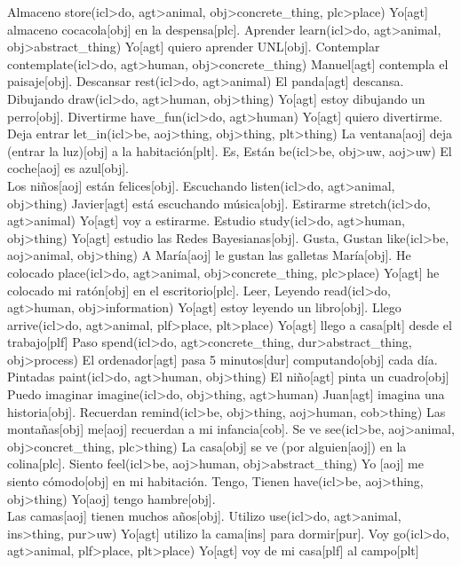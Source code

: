 \documentclass{article}
\begin{document}
{
    \uw
    {Almaceno}
    {store(icl>do, agt>animal, obj>concrete\_thing, plc>place)}
    {Yo[agt] almaceno cocacola[obj] en la despensa[plc].}
    \uw
    {Aprender}
    {learn(icl>do, agt>animal, obj>abstract\_thing)}
    {Yo[agt] quiero aprender UNL[obj].}
    \uw
    {Contemplar}
    {contemplate(icl>do, agt>human, obj>concrete\_thing)}
    {Manuel[agt] contempla el paisaje[obj].}
    \uw
    {Descansar}
    {rest(icl>do, agt>animal)}
    {El panda[agt] descansa.}
    \uw
    {Dibujando}
    {draw(icl>do, agt>human, obj>thing)}
    {Yo[agt] estoy dibujando un perro[obj].}
    \uw
    {Divertirme}
    {have\_fun(icl>do, agt>human)}
    {Yo[agt] quiero divertirme.}
    \uw
    {Deja entrar}
    {let\_in(icl>be, aoj>thing, obj>thing, plt>thing)}
    {La ventana[aoj] deja (entrar la luz)[obj] a la habitación[plt].}
    \uw
    {Es, Están}
    {be(icl>be, obj>uw, aoj>uw)}
    {El coche[aoj] es azul[obj].\\
    Los niños[aoj] están felices[obj].}
    \uw
    {Escuchando}
    {listen(icl>do, agt>animal, obj>thing)}
    {Javier[agt] está escuchando música[obj].}
    \uw
    {Estirarme}
    {stretch(icl>do, agt>animal)}
    {Yo[agt] voy a estirarme.}
    \uw
    {Estudio}
    {study(icl>do, agt>human, obj>thing)}
    {Yo[agt] estudio las Redes Bayesianas[obj].}
    \uw
    {Gusta, Gustan}
    {like(icl>be, aoj>animal, obj>thing)}
    {A María[aoj] le gustan las galletas María[obj].}
    \uw
    {He colocado}
    {place(icl>do, agt>animal, obj>concrete\_thing, plc>place)}
    {Yo[agt] he colocado mi ratón[obj] en el escritorio[plc].}
    \uw
    {Leer, Leyendo}
    {read(icl>do, agt>human, obj>information)}
    {Yo[agt] estoy leyendo un libro[obj].}
    \uw
    {Llego}
    {arrive(icl>do, agt>animal, plf>place, plt>place)}
    {Yo[agt] llego a casa[plt] desde el trabajo[plf]}
    \uw
    {Paso}
    {spend(icl>do, agt>concrete\_thing, dur>abstract\_thing, obj>process)}
    {El ordenador[agt] pasa 5 minutos[dur] computando[obj] cada día.}
    \uw
    {Pintadas}
    {paint(icl>do, agt>human, obj>thing)}
    {El niño[agt] pinta un cuadro[obj]}
    \uw
    {Puedo imaginar}
    {imagine(icl>do, obj>thing, agt>human)}
    {Juan[agt] imagina una historia[obj].}
    \uw
    {Recuerdan}
    {remind(icl>be, obj>thing, aoj>human, cob>thing)}
    {Las montañas[obj] me[aoj] recuerdan a mi infancia[cob].}
    \uw
    {Se ve}
    {see(icl>be, aoj>animal, obj>concret\_thing, plc>thing)}
    {La casa[obj] se ve (por alguien[aoj]) en la colina[plc].}
    \uw
    {Siento}
    {feel(icl>be, aoj>human, obj>abstract\_thing)}
    {Yo [aoj] me siento cómodo[obj] en mi habitación.}
    \uw
    {Tengo, Tienen}
    {have(icl>be, aoj>thing, obj>thing)}
    {Yo[aoj] tengo hambre[obj].\\
    Las camas[aoj] tienen muchos años[obj].}
    \uw
    {Utilizo}
    {use(icl>do, agt>animal, ins>thing, pur>uw)}
    {Yo[agt] utilizo la cama[ins] para dormir[pur].}
    \uw
    {Voy}
    {go(icl>do, agt>animal, plf>place, plt>place)}
    {Yo[agt] voy de mi casa[plf] al campo[plt]}
}
\end{document}

